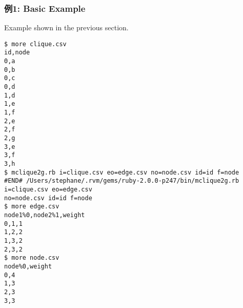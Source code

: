 \subsubsection*{例1: Basic Example}

Example shown in the previous section. 


\begin{Verbatim}[baselinestretch=0.7,frame=single]
$ more clique.csv
id,node
0,a
0,b
0,c
0,d
1,d
1,e
1,f
2,e
2,f
2,g
3,e
3,f
3,h
$ mclique2g.rb i=clique.csv eo=edge.csv no=node.csv id=id f=node
#END# /Users/stephane/.rvm/gems/ruby-2.0.0-p247/bin/mclique2g.rb i=clique.csv eo=edge.csv 
no=node.csv id=id f=node
$ more edge.csv
node1%0,node2%1,weight
0,1,1
1,2,2
1,3,2
2,3,2
$ more node.csv
node%0,weight
0,4
1,3
2,3
3,3
\end{Verbatim}
